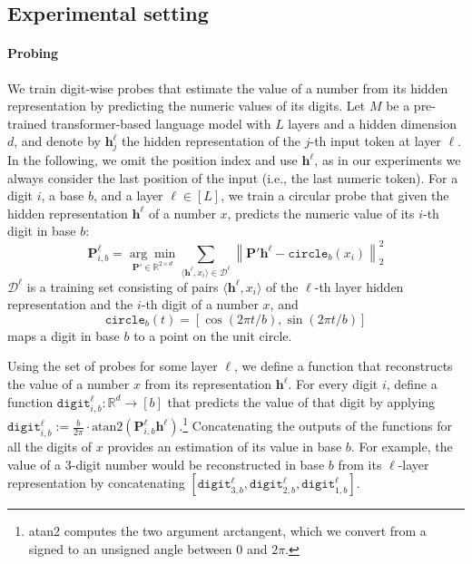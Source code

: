 \documentclass[11pt]{article}
\begin{document}
\subsection{Experimental setting}

\paragraph{Probing} 
We train digit-wise probes that estimate the value of a number from its hidden representation by predicting the numeric values of its digits.
Let $M$ be a pre-trained transformer-based language model \citep{vaswani2023attentionneed} with $L$ layers and a hidden dimension $d$, and denote by $\mathbf{h}^\ell_{j}$ the hidden representation of the $j$-th input token at layer $\ell$. In the following, we omit the position index and use $\mathbf{h}^\ell$, as in our experiments we always consider the last position of the input (i.e., the last numeric token).
For a digit $i$, a base $b$, and a layer $\ell \in [L]$, we train a circular probe \citep{engels2024languagemodelfeatureslinear} that given the hidden representation $\mathbf{h}^\ell$ of a number $x$, predicts the numeric value of its $i$-th digit in base $b$:
{\begin{equation}
\label{eq:circ_probe}
\mathbf{P}_{i,b}^\ell = \underset{{\mathbf{P}'\in\mathbb{R}^{2\times d}}}{\arg\min} \sum_{\langle \mathbf{h}^\ell, x_i \rangle \in \mathcal{D}^\ell} \left\|\mathbf{P}' \mathbf{h^\ell} - \texttt{circle}_b(x_i) \right\|_2^2 
\end{equation}}
$\mathcal{D}^\ell$ is a training set consisting of pairs $\langle \mathbf{h}^\ell, x_i \rangle$ of the $\ell$-th layer hidden representation and the $i$-th digit of a number $x$, and
\begin{equation}
\label{eq:circle}
    \texttt{circle}_b(t) = [\cos(2\pi t/b),\sin(2\pi t/b)]
\end{equation} 
maps a digit in base $b$ to a point on the unit circle.


Using the set of probes for some layer $\ell$, we define a function that reconstructs the value of a number $x$ from its representation $\mathbf{h}^\ell$.
For every digit $i$, define a function ${\texttt{digit}_{i,b}^\ell: \mathbb{R}^d \to [b]}$
that predicts the value of that digit by applying $\texttt{digit}_{i,b}^\ell := \frac{b}{2\pi} \cdot \text{atan2}(\mathbf{P}_{i,b}^\ell \mathbf{h}^\ell)$.\footnote{atan2 computes the two argument arctangent, which we convert from a signed to an unsigned angle between 0 and $2\pi$.} Concatenating the outputs of the functions for all the digits of $x$ provides an estimation of its value in base $b$. For example, the value of a 3-digit number would be reconstructed in base $b$ from its $\ell$-layer representation by concatenating  $[ \texttt{digit}_{3,b}^\ell, \texttt{digit}_{2,b}^\ell, \texttt{digit}_{1,b}^\ell ]$.
\end{document}
